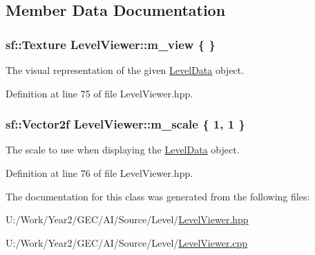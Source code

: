 \subsection{Member Data Documentation}
\hypertarget{classLevelViewer_a21afdfc2bfc80328897725b1cb911b15}{
\subsubsection[{m\+\_\+view}]{\setlength{\rightskip}{0pt plus 5cm}sf\+::\+Texture Level\+Viewer\+::m\+\_\+view \{ \}\hspace{0.3cm}{\ttfamily [private]}}}\label{classLevelViewer_a21afdfc2bfc80328897725b1cb911b15}


The visual representation of the given \hyperlink{classLevelData}{Level\+Data} object. 



Definition at line 75 of file Level\+Viewer.\+hpp.

\hypertarget{classLevelViewer_a1b51d762bb2f7d1917e41bb82d21e90a}{
\subsubsection[{m\+\_\+scale}]{\setlength{\rightskip}{0pt plus 5cm}sf\+::\+Vector2f Level\+Viewer\+::m\+\_\+scale \{ 1, 1 \}\hspace{0.3cm}{\ttfamily [private]}}}\label{classLevelViewer_a1b51d762bb2f7d1917e41bb82d21e90a}


The scale to use when displaying the \hyperlink{classLevelData}{Level\+Data} object. 



Definition at line 76 of file Level\+Viewer.\+hpp.



The documentation for this class was generated from the following files\+:\begin{DoxyCompactItemize}
\item 
U\+:/\+Work/\+Year2/\+G\+E\+C/\+A\+I/\+Source/\+Level/\hyperlink{LevelViewer_8hpp}{Level\+Viewer.\+hpp}\item 
U\+:/\+Work/\+Year2/\+G\+E\+C/\+A\+I/\+Source/\+Level/\hyperlink{LevelViewer_8cpp}{Level\+Viewer.\+cpp}\end{DoxyCompactItemize}
